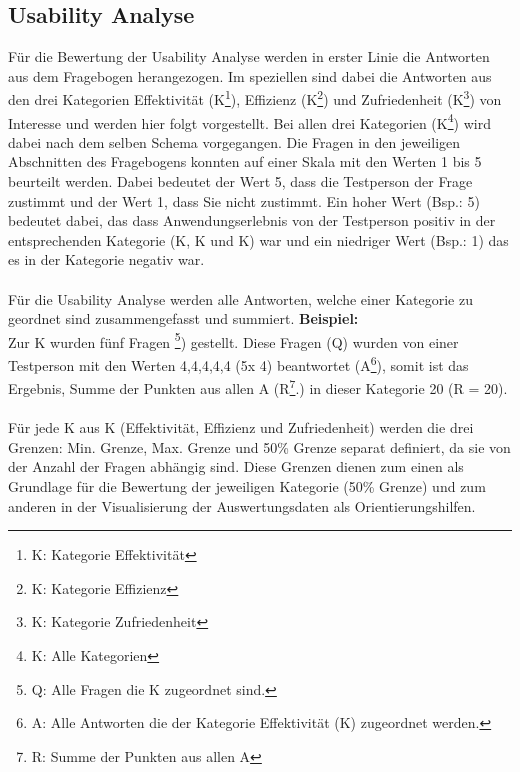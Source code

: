 \documentclass[Bachelorarbeit.tex]{subfiles}
\begin{document}
\subsection{Usability Analyse}
\label{ergebnis_usability}
Für die Bewertung der Usability Analyse werden in erster Linie die Antworten aus dem Fragebogen herangezogen.
Im speziellen sind dabei die Antworten aus den drei Kategorien Effektivität (K\footnote{K: Kategorie Effektivität}), Effizienz (K\footnote{K: Kategorie Effizienz}) und Zufriedenheit (K\footnote{K: Kategorie Zufriedenheit}) von Interesse und werden hier folgt vorgestellt.
Bei allen drei Kategorien (K\footnote{K: Alle Kategorien}) wird dabei nach dem selben Schema vorgegangen. 
Die Fragen in den jeweiligen Abschnitten des Fragebogens konnten auf einer Skala mit den Werten 1 bis 5 beurteilt werden. 
Dabei bedeutet der Wert 5, dass die Testperson der Frage zustimmt und der Wert 1, dass Sie nicht zustimmt. 
Ein hoher Wert (Bsp.: 5) bedeutet dabei, das dass Anwendungserlebnis von der Testperson positiv in der entsprechenden Kategorie (K, K und K) war und ein niedriger Wert (Bsp.: 1) das es in der Kategorie negativ war.\\
\\
Für die Usability Analyse werden alle Antworten, welche einer Kategorie zu geordnet sind zusammengefasst und summiert. 
\textbf{Beispiel:} \\
Zur K wurden fünf Fragen \footnote{Q: Alle Fragen die K zugeordnet sind.}) gestellt. 
Diese Fragen (Q) wurden von einer Testperson mit den Werten 4,4,4,4,4 (5x 4) beantwortet (A\footnote{A: Alle Antworten die der Kategorie Effektivität (K) zugeordnet werden.}), somit ist das Ergebnis, Summe der Punkten aus allen A (R\footnote{R: Summe der Punkten aus allen A}.) in dieser Kategorie 20 (R = 20).\\
\\
Für jede K aus K (Effektivität, Effizienz und Zufriedenheit) werden die drei Grenzen: Min. Grenze, Max. Grenze und 50\% Grenze separat definiert, da sie von der Anzahl der Fragen abhängig sind. 
Diese Grenzen dienen zum einen als Grundlage für die Bewertung der jeweiligen Kategorie (50\% Grenze) und zum anderen in der Visualisierung der Auswertungsdaten als Orientierungshilfen.
\end{document}
